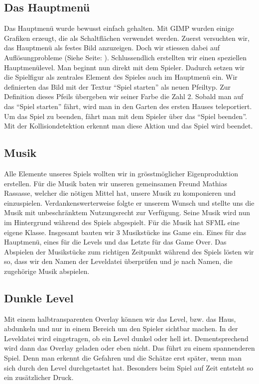 \documentclass[11pt,a4paper]{scrbook}
\newcommand{\q}[1]{``#1''}
\begin{document}
\subsection{Das Hauptmenü}     
Das Hauptmenü wurde bewusst einfach gehalten. Mit GIMP wurden     
einige Grafiken erzeugt, die als Schaltflächen verwendet werden.
Zuerst versuchten wir, das Hauptmenü als festes Bild anzuzeigen. Doch wir stiessen dabei auf Auflösungprobleme (Siehe Seite: \pageref{aufloesungsprobleme}).
Schlussendlich erstellten wir einen speziellen Hauptmenülevel.
Man beginnt nun direkt mit dem Spieler.
Dadurch setzen wir die Spielfigur als zentrales Element des Spieles auch im Hauptmenü ein.
Wir definierten das Bild mit der Textur \q{Spiel starten} als neuen Pfeiltyp. 
Zur Definition dieses Pfeils übergeben wir seiner Farbe die Zahl 2. 
Sobald man auf das \q{Spiel starten} fährt, wird man in den Garten des ersten Hauses teleportiert. 
Um das Spiel zu beenden, fährt man mit dem Spieler über das \q{Spiel beenden}. Mit der Kollisiondetektion erkennt man diese Aktion und das Spiel wird beendet.

\subsection{Musik}     
Alle Elemente unseres Spiels wollten wir in grösstmöglicher Eigenproduktion erstellen. Für die Musik baten wir unseren gemeinsamen Freund Mathias Rassasse, welcher die nötigen Mittel hat, unsere Musik zu komponieren und einzuspielen. Verdankenswerterweise folgte er unserem Wunsch und stellte uns die Musik mit unbeschränktem Nutzungsrecht zur Verfügung. 
Seine Musik wird nun im Hintergrund während des Spiels abgespielt. 
Für die Musik hat SFML eine eigene Klasse. 
Insgesamt bauten wir 3 Musikstücke ins Game ein. 
Eines für das Hauptmenü, eines für die Levels und das Letzte für das Game Over. 
Das Abspielen der Musikstücke zum richtigen Zeitpunkt während des Spiels lösten wir so, dass wir den Namen der Leveldatei überprüfen und je nach Namen, die zugehörige Musik abspielen.
    
    
\subsection{Dunkle Level}     
Mit einem halbtransparenten Overlay können wir das Level, bzw. das Haus, abdunkeln und nur in einem Bereich um den Spieler sichtbar machen.
In der Leveldatei wird eingetragen, ob ein Level dunkel oder hell ist. Dementsprechend wird dann das Overlay geladen oder eben nicht. Das führt zu einem spannenderen Spiel. Denn man erkennt die Gefahren und die Schätze erst später, wenn man sich durch den Level durchgetastet hat.
Besonders beim Spiel auf Zeit entsteht so ein zusätzlicher Druck. 
\end{document}
